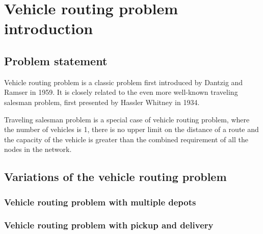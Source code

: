 \chapter{Vehicle routing problem introduction}
\label{chapter:background} 

\section{Problem statement}
Vehicle routing problem is a classic problem first introduced by Dantzig and Ramser in 1959\cite{dantzig1959truck}. It is closely related to the even more well-known traveling salesman problem, first presented by Hassler Whitney in 1934\cite{flood1956traveling}. 

Traveling salesman problem is a special case of vehicle routing problem, where the number of vehicles is 1, there is no upper limit on the distance of a route and the capacity of the vehicle is greater than the combined requirement of all the nodes in the network. 



\section{Variations of the vehicle routing problem}
\subsection{Vehicle routing problem with multiple depots}
\subsection{Vehicle routing problem with pickup and delivery}
